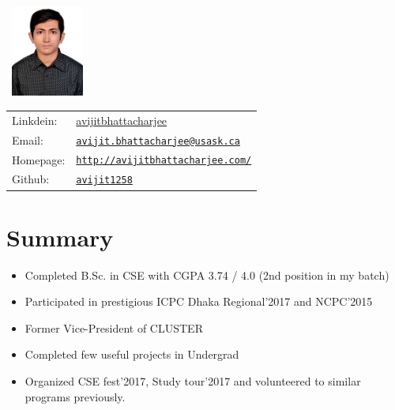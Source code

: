\documentclass[margin]{res}
\begin{document}
\begin{resume} 
 \begin{minipage}{0.30\linewidth}
    \includegraphics[width=2.75cm, height=3cm]{profile.jpg}\\

 \end{minipage}
 \begin{minipage}{0.45\linewidth}
 	\begin{tabular}{ll}
 		Linkdein: &  \href{https://www.linkedin.com/in/avijit-bhattacharjee/}{avijitbhattacharjee} \\
 		Email: & \href{mailto:avijit.bhattacharjee@usask.ca}{\tt avijit.bhattacharjee@usask.ca}\\
 		Homepage: & \href{http://avijitbhattacharjee.com/}{\tt http://avijitbhattacharjee.com/} \\
 		Github: & \href{https://github.com/avijit1258}{\tt avijit1258}\\
 	\end{tabular}
 \end{minipage}
 
 \section{Summary}
 \begin{itemize} \itemsep -2pt
                 \item    Completed B.Sc. in CSE with CGPA 3.74 / 4.0 (2nd position in my batch)
                 \item    Participated in prestigious ICPC Dhaka Regional'2017 and NCPC'2015
                 \item    Former Vice-President of CLUSTER
                 \item    Completed few useful projects in Undergrad
                 \item    Organized CSE fest'2017, Study tour'2017 and volunteered to similar programs previously.
     \end{itemize}
 

\end{resume}
\end{document}
